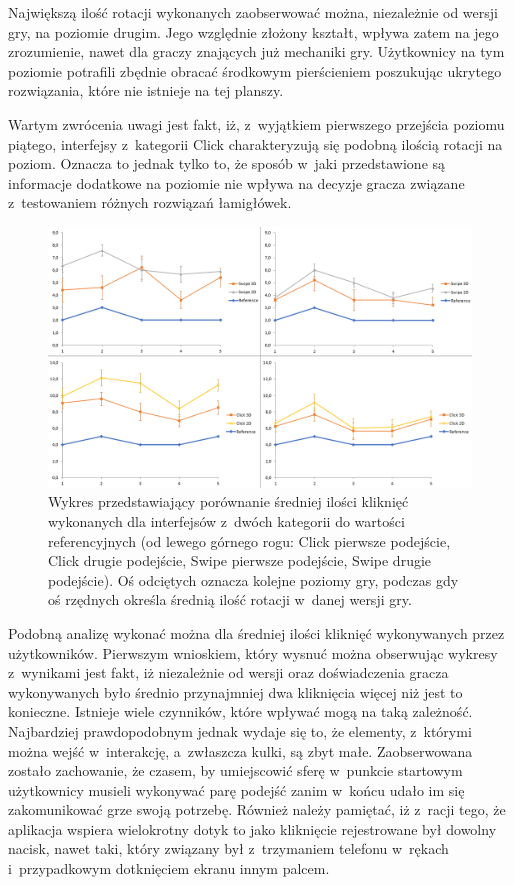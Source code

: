 \documentclass[a4paper,12pt,numbers=noenddot]{report}
\begin{document}
Największą ilość rotacji wykonanych zaobserwować można, niezależnie od wersji gry, na poziomie drugim. Jego względnie złożony kształt, wpływa zatem na jego zrozumienie, nawet dla graczy znających już mechaniki gry. Użytkownicy na tym poziomie potrafili zbędnie obracać środkowym pierścieniem poszukując ukrytego rozwiązania, które nie istnieje na tej planszy. 

Wartym zwrócenia uwagi jest fakt, iż, z~wyjątkiem pierwszego przejścia poziomu piątego, interfejsy z~kategorii Click charakteryzują się podobną ilością rotacji na poziom. Oznacza to jednak tylko to, że sposób w~jaki przedstawione są informacje dodatkowe na poziomie nie wpływa na decyzje gracza związane z~testowaniem różnych rozwiązań łamigłówek. \\

\begin{figure}[h!]
	\centering
  	\includegraphics[width=\linewidth]{diag/ref_Clicks.png}
	\caption{Wykres przedstawiający porównanie średniej ilości kliknięć wykonanych dla interfejsów z~dwóch kategorii do wartości referencyjnych (od lewego górnego rogu: Click pierwsze podejście, Click drugie podejście, Swipe pierwsze podejście, Swipe drugie podejście). Oś odciętych oznacza kolejne poziomy gry, podczas gdy oś rzędnych określa średnią ilość rotacji w~danej wersji gry.}
	\label{fig:ref:Clicks}
\end{figure}

Podobną analizę wykonać można dla średniej ilości kliknięć wykonywanych przez użytkowników. Pierwszym wnioskiem, który wysnuć można obserwując wykresy z~wynikami jest fakt, iż niezależnie od wersji oraz doświadczenia gracza wykonywanych było średnio przynajmniej dwa kliknięcia więcej niż jest to konieczne. Istnieje wiele czynników, które wpływać mogą na taką zależność. Najbardziej prawdopodobnym jednak wydaje się to, że elementy, z~którymi można wejść w~interakcję, a~zwłaszcza kulki, są zbyt małe. Zaobserwowana zostało zachowanie, że czasem, by umiejscowić sferę w~punkcie startowym użytkownicy musieli wykonywać parę podejść zanim w~końcu udało im się zakomunikować grze swoją potrzebę. Również należy pamiętać, iż z~racji tego, że aplikacja wspiera wielokrotny dotyk to jako kliknięcie rejestrowane był dowolny nacisk, nawet taki, który związany był z~trzymaniem telefonu w~rękach i~przypadkowym dotknięciem ekranu innym palcem. 
\end{document}
